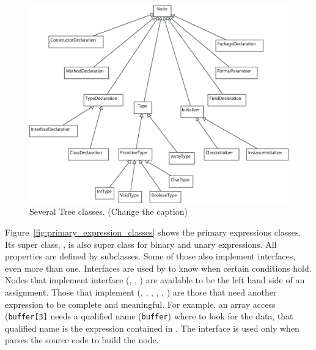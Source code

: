 \begin{figure}[!htb]
\begin{center}
\includegraphics[width=\textwidth]{images/several.eps}
\caption{Several Tree classes. (Change the caption)}
\label{fig:several_tree_classes}
\end{center}
\end{figure}

Figure~\ref{fig:primary_expression_classes} shows the primary
expressions classes. Its super class, , is also super
class for binary and unary expressions. All properties are defined
by  subclasses. Some of those also implement
interfaces, even more than one. Interfaces are used by \djava{} to
know when certain conditions hold. Nodes that implement
 interface (, ,
) are available to be the left hand side of an
assignment. Those that implement 
(, ,
, ,
, ) are those that need another
expression to be complete and meaningful. For example, an array
access ({\tt buffer[3]} needs a qualified name ({\tt buffer}) where to look for the data, that
qualified name is the expression contained in . The interface
 is used only when \djava{} parses the
source code to build the  node.

